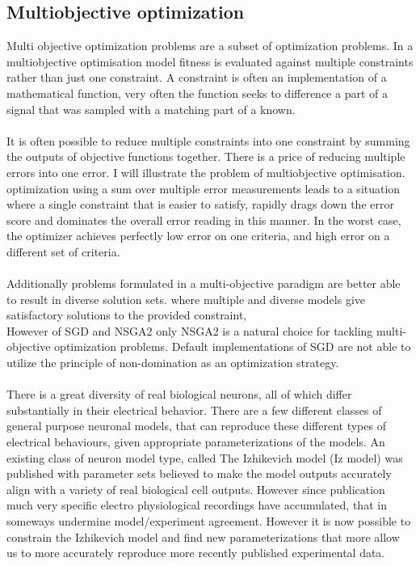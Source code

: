 \subsection{Multiobjective optimization} Multi objective optimization problems are a subset of optimization problems. In a multiobjective optimisation model fitness is evaluated against multiple constraints rather than just one constraint. A constraint is often an implementation of a mathematical function, very often the function seeks to difference a part of a signal that was sampled with a matching part of a known.\\
\\
It is often possible to reduce multiple constraints into one constraint by summing the outputs of objective functions together. There is a price of reducing multiple errors into one error. I will illustrate the problem of multiobjective optimisation. optimization using a sum over multiple error measurements leads to a situation where a single constraint that is easier to satisfy, rapidly drags down the error score and dominates the overall error reading in this manner. In the worst case, the optimizer achieves perfectly low error on one criteria, and high error on a different set of criteria.\\
\\
Additionally problems formulated in a multi-objective paradigm are better able to result in diverse solution sets. where multiple and diverse models give satisfactory solutions to the provided constraint, 
\\
However of SGD and NSGA2 only NSGA2 is a natural choice for tackling multi-objective optimization problems. Default implementations of SGD are not able to utilize the principle of non-domination as an optimization strategy.\\
\\
There is a great diversity of real biological neurons, all of which differ substantially in their electrical behavior. There are a few different classes of general purpose neuronal models, that can reproduce these different types of electrical behaviours, given appropriate parameterizations of the models.\newline
\newline
An existing class of neuron model type, called The Izhikevich model \cite{izhikevich2003simple} (Iz model) was published with parameter sets believed to make the model outputs accurately align with a variety of real biological cell outputs. However since publication much very specific electro physiological recordings have accumulated, that in someways undermine model/experiment agreement. However it is now possible to constrain the Izhikevich model and find new parameterizations that more allow us to more accurately reproduce more recently published experimental data.\newline
\newline


